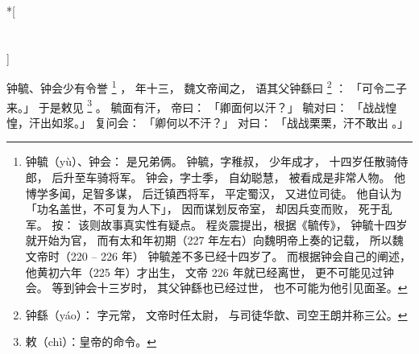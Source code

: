 
\switchcolumn[0]*[\section{}]

钟毓、钟会少有令誉%
\footnote{%
    钟毓（yù）、钟会：
        是兄弟俩。
        钟毓，字稚叔，
        少年成才，
        十四岁任散骑侍郎，
        后升至车骑将军。
        钟会，字士季，
        自幼聪慧，
        被看成是非常人物。
        他博学多闻，足智多谋，
        后迁镇西将军，
        平定蜀汉，
        又进位司徒。
        他自认为
        「功名盖世，不可复为人下」，
        因而谋划反帝室，
        却因兵变而败，
        死于乱军。
    按：
        该则故事真实性有疑点。
        程炎震提出，根据《毓传》，
        钟毓十四岁就开始为官，
        而有太和年初期（227 年左右）向魏明帝上奏的记载，
        所以魏文帝时（220 -- 226 年）
        钟毓差不多已经十四岁了。
        而根据钟会自己的阐述，
        他黄初六年（225 年）才出生，
        文帝 226 年就已经离世，
        更不可能见过钟会。
        等到钟会十三岁时，
        其父钟繇也已经过世，
        也不可能为他引见面圣。
}%
，
年十三，
魏文帝闻之，
语其父钟繇曰%
\footnote{%
    钟繇（yáo）：
        字元常，
        文帝时任太尉，
        与司徒华歆、司空王朗并称三公。
}%
：
「可令二子来。」
于是敕见%
\footnote{%
    敕（chì）：皇帝的命令。
}%
。
毓面有汗，
帝曰：
「卿面何以汗？」
毓对曰：
「战战惶惶，汗出如浆。」
复问会：
「卿何以不汗？」
对曰：
「战战栗栗，汗不敢出 。」

\switchcolumn




